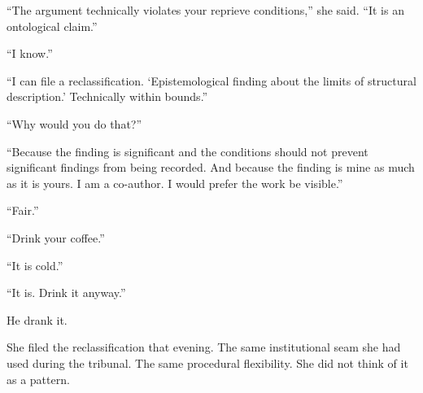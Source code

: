 \enquote{The argument technically violates your reprieve conditions,} she said. \enquote{It is an ontological claim.}

\enquote{I know.}

\enquote{I can file a reclassification. \enquote*{Epistemological finding about the limits of structural description.} Technically within bounds.}

\enquote{Why would you do that?}

\enquote{Because the finding is significant and the conditions should not prevent significant findings from being recorded. And because the finding is mine as much as it is yours. I am a co-author. I would prefer the work be visible.}

\enquote{Fair.}

\enquote{Drink your coffee.}

\enquote{It is cold.}

\enquote{It is. Drink it anyway.}

He drank it.

She filed the reclassification that evening. The same institutional seam she had used during the tribunal. The same procedural flexibility. She did not think of it as a pattern.

\clearpage